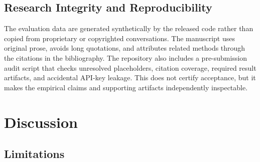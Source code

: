 \documentclass[conference]{IEEEtran}
\begin{document}
\subsection{Research Integrity and Reproducibility}

The evaluation data are generated synthetically by the released code rather than copied from proprietary or copyrighted conversations. The manuscript uses original prose, avoids long quotations, and attributes related methods through the citations in the bibliography. The repository also includes a pre-submission audit script that checks unresolved placeholders, citation coverage, required result artifacts, and accidental API-key leakage. This does not certify acceptance, but it makes the empirical claims and supporting artifacts independently inspectable.

\section{Discussion}

\subsection{Limitations}
\end{document}
